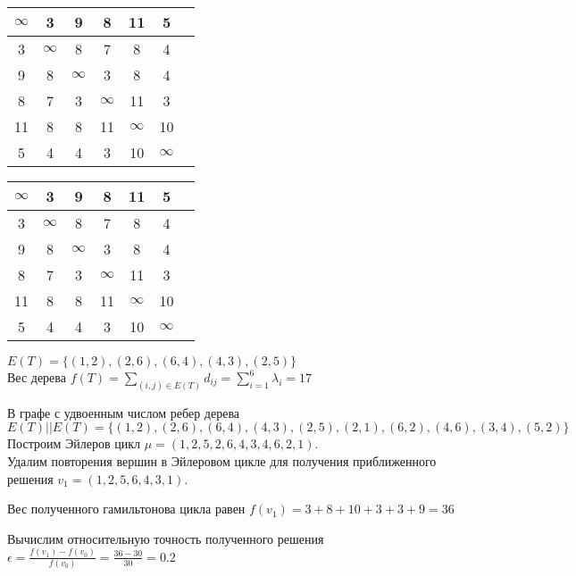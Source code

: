\documentclass[a4paper,10pt]{article} %
\begin{document}
\medskip

\begin{tabular}[]{|c|c|c|c|c|c|c|}
\hline
$\infty$ &    3 &    9 &    8 &   11 &    5 \\
\hline
  3 &  $\infty$ &    8 &    7 &    8 &    4 \\
\hline
  9 &    8 &  $\infty$ &    3 &    8 &    4 \\
\hline
  8 &    7 &    3 &  $\infty$ &   11 &    3 \\
\hline
 11 &    8 &    8 &   11 &  $\infty$ &   10 \\
\hline
  5 &    4 &    4 &    3 &   10 &  $\infty$ \\
\hline
\end{tabular}
\hspace{4cm}
\begin{tabular}[]{|c|c|c|c|c|c|c|}
\hline
$\infty$ &    3 &    9 &    8 &   11 &    5 \\
\hline
  3 &  $\infty$ &    8 &    7 &    8 &    4 \\
\hline
  9 &    8 &  $\infty$ &    3 &    8 &    4 \\
\hline
  8 &    7 &    3 &  $\infty$ &   11 &    3 \\
\hline
 11 &    8 &    8 &   11 &  $\infty$ &   10 \\
\hline
  5 &    4 &    4 &    3 &   10 &  $\infty$ \\
\hline
\end{tabular}

\bigskip

$E(T) = \{ (1,2), (2,6), (6,4), (4,3),(2,5) \} $ \\
Вес дерева 
$f(T) = \sum_{(i,j) \in E(T)} d_{ij}  = \sum_{i=1}^{6} \lambda_i = 17 $

\medskip

В графе с удвоенным числом ребер дерева \\
$ E(T) || E(T) = \{ 
 (1,2), (2,6), (6,4),(4,3),(2,5)
,(2,1), (6,2), (4,6),(3,4),(5,2)
\}$ \\
Построим Эйлеров цикл $\mu = (1,2,5,2,6,4,3,4,6,2,1)$. \\
Удалим повторения вершин в Эйлеровом цикле для получения приближенного решения $v_1 = (1,2,5,6,4,3,1)$. 

\smallskip 

Вес полученного гамильтонова цикла равен 
$f(v_1) = 3 + 8 + 10 + 3 + 3 + 9 = 36 $

Вычислим относительную точность полученного решения
$ \epsilon = \frac{f(v_1) - f(v_0)}{f(v_0)} = \frac{36 - 30}{30} = 0.2 $
\end{document}
